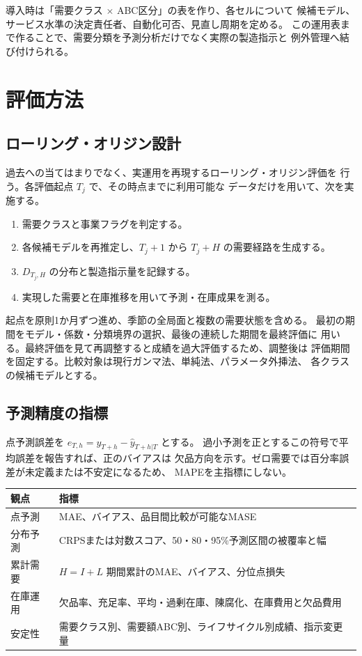 \documentclass[a4paper,11pt]{jsarticle}
\begin{document}
導入時は「需要クラス $\times$ ABC区分」の表を作り、各セルについて
候補モデル、サービス水準の決定責任者、自動化可否、見直し周期を定める。
この運用表まで作ることで、需要分類を予測分析だけでなく実際の製造指示と
例外管理へ結び付けられる。

\section{評価方法}
\subsection{ローリング・オリジン設計}
過去への当てはまりでなく、実運用を再現するローリング・オリジン評価を
行う\cite{tashman2000}。各評価起点 $T_j$ で、その時点までに利用可能な
データだけを用いて、次を実施する。
\begin{enumerate}
\item 需要クラスと事業フラグを判定する。
\item 各候補モデルを再推定し、$T_j+1$ から $T_j+H$ の需要経路を生成する。
\item $D_{T_j,H}$ の分布と製造指示量を記録する。
\item 実現した需要と在庫推移を用いて予測・在庫成果を測る。
\end{enumerate}
起点を原則1か月ずつ進め、季節の全局面と複数の需要状態を含める。
最初の期間をモデル・係数・分類境界の選択、最後の連続した期間を最終評価に
用いる。最終評価を見て再調整すると成績を過大評価するため、調整後は
評価期間を固定する。比較対象は現行ガンマ法、単純法、パラメータ外挿法、
各クラスの候補モデルとする。

\subsection{予測精度の指標}
点予測誤差を $e_{T,h}=y_{T+h}-\hat y_{T+h|T}$ とする。
過小予測を正とするこの符号で平均誤差を報告すれば、正のバイアスは
欠品方向を示す。ゼロ需要では百分率誤差が未定義または不安定になるため、
MAPEを主指標にしない。
\begin{center}\begin{tabular}{>{\raggedright\arraybackslash}p{25mm}p{110mm}}\toprule
観点 & 指標\\\midrule
点予測 & MAE、バイアス、品目間比較が可能なMASE\cite{hyndman2006}\\
分布予測 & CRPSまたは対数スコア、50・80・95\%予測区間の被覆率と幅\cite{gneiting2007}\\
累計需要 & $H=I+L$ 期間累計のMAE、バイアス、分位点損失\\
在庫運用 & 欠品率、充足率、平均・過剰在庫、陳腐化、在庫費用と欠品費用\\
安定性 & 需要クラス別、需要額ABC別、ライフサイクル別成績、指示変更量\\\bottomrule
\end{tabular}\end{center}
\end{document}
